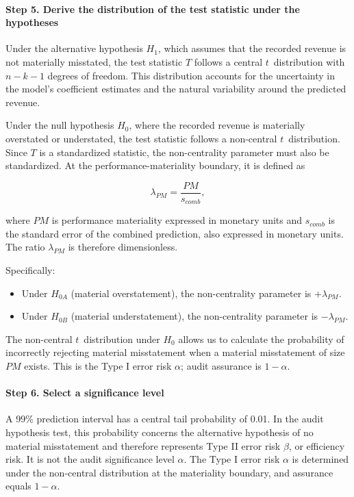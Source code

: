 

\paragraph{Step 5. Derive the distribution of the test statistic under the hypotheses}
Under the alternative hypothesis $H_1$, which assumes that the recorded revenue is not materially misstated, the test statistic $T$ follows a central $t$~distribution with $n-k-1$ degrees of freedom. This distribution accounts for the uncertainty in the model's coefficient estimates and the natural variability around the predicted revenue.

Under the null hypothesis $H_0$, where the recorded revenue is materially overstated or understated, the test statistic follows a non-central $t$~distribution. Since $T$ is a standardized statistic, the non-centrality parameter must also be standardized. At the performance-materiality boundary, it is defined as

\begin{equation}
\label{eq:standardized_noncentrality_parameter}
  \lambda_{PM} = \frac{PM}{s_{comb}} ,
\end{equation}

where $PM$ is performance materiality expressed in monetary units and $s_{comb}$ is the standard error of the combined prediction, also expressed in monetary units. The ratio $\lambda_{PM}$ is therefore dimensionless.

Specifically:
\begin{itemize}
\item Under $H_{0A}$ (material overstatement), the non-centrality parameter is $+\lambda_{PM}$.
\item Under $H_{0B}$ (material understatement), the non-centrality parameter is $-\lambda_{PM}$.
\end{itemize}

\bigskip
The non-central $t$~distribution under $H_0$ allows us to calculate the probability of incorrectly rejecting material misstatement when a material misstatement of size $PM$ exists. This is the Type I error risk $\alpha$; audit assurance is $1-\alpha$.

\paragraph{Step 6. Select a significance level}
A 99\% prediction interval has a central tail probability of 0.01. In the audit hypothesis test, this probability concerns the alternative hypothesis of no material misstatement and therefore represents Type II error risk $\beta$, or efficiency risk. It is not the audit significance level $\alpha$. The Type I error risk $\alpha$ is determined under the non-central distribution at the materiality boundary, and assurance equals $1-\alpha$.

